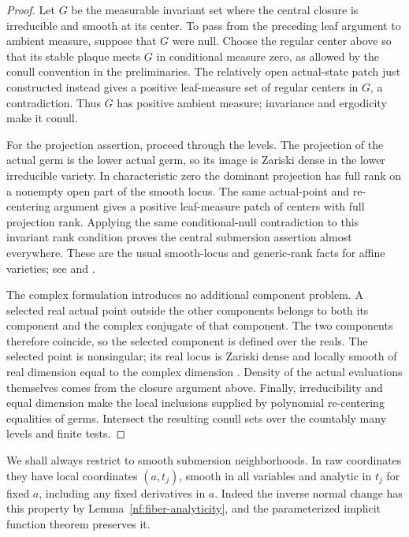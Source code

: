 \begin{proof}
Let $G$ be the measurable invariant set where the central closure is
irreducible and smooth at its center. To pass from the preceding leaf
argument to ambient measure, suppose that $G$ were null. Choose the
regular center above so that its stable plaque meets $G$ in conditional
measure zero, as allowed by the conull convention in the preliminaries.
The relatively open actual-state patch just constructed instead gives
a positive leaf-measure set of regular centers in $G$, a contradiction.
Thus $G$ has positive ambient measure; invariance and ergodicity make
it conull.

For the projection assertion, proceed through the levels.
The projection of the actual germ is the lower actual germ,
so its image is Zariski dense in the lower irreducible variety.
In characteristic zero the dominant projection has full rank on a
nonempty open part of the smooth locus. The same actual-point and
re-centering argument gives a positive leaf-measure patch of centers
with full projection rank. Applying the same conditional-null
contradiction to this invariant rank condition proves the central
submersion assertion almost everywhere.
These are the usual smooth-locus and generic-rank facts for affine
varieties; see \citet{Hartshorne1977} and
\citet[Tags~0B8X, 07ND, and~02K4]{StacksProject}.

The complex formulation introduces no additional component problem.
A selected real actual point outside the other components belongs to
both its component and the complex conjugate of that component. The
two components therefore coincide, so the selected component is defined
over the reals. The selected point is nonsingular; its real locus is
Zariski dense and locally smooth of real dimension equal to the complex
dimension \citep[Theorem~2.2.9(2) and its proof]{Mangolte2019}.
Density of the actual evaluations themselves comes from the closure
argument above. Finally, irreducibility and equal dimension make the
local inclusions supplied by polynomial re-centering equalities of
germs. Intersect the resulting conull sets over the countably many
levels and finite tests.
\end{proof}

We shall always restrict to smooth submersion neighborhoods. In raw
coordinates they have local coordinates $(a,t_j)$, smooth in all
variables and analytic in $t_j$ for fixed $a$, including any fixed
derivatives in $a$. Indeed the inverse normal change has this property
by Lemma~\ref{nf:fiber-analyticity}, and the parameterized implicit function
theorem preserves it.

